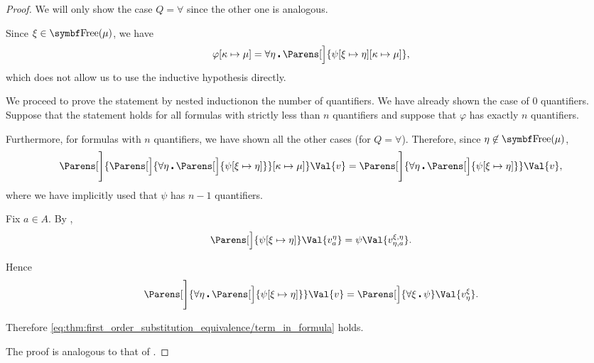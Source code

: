 \begin{proof}
  We will only show the case \( Q = \forall \) since the other one is analogous.

  Since \( \xi \in \Bold{Free}(\mu) \), we have
  \begin{equation*}
    \varphi[\kappa \mapsto \mu]
    =
    \forall \eta \centerdot \Parens[\Big]{ \psi[\xi \mapsto \eta][\kappa \mapsto \mu] },
  \end{equation*}
  which does not allow us to use the inductive hypothesis directly.

  We proceed to prove the statement by nested induction\IND on the number of quantifiers. We have already shown the case of \( 0 \) quantifiers. Suppose that the statement holds for all formulas with strictly less than \( n \) quantifiers and suppose that \( \varphi \) has exactly \( n \) quantifiers.

  Furthermore, for formulas with \( n \) quantifiers, we have shown all the other cases (for \( Q = \forall \)). Therefore, since \( \eta \not\in \Bold{Free}(\mu) \),
  \begin{equation*}
    \Parens[\Bigg]{ \Parens[\Big]{ \forall \eta \centerdot \Parens[\Big]{ \psi[\xi \mapsto \eta] } }[\kappa \mapsto \mu] }\Val{v}
    =
    \Parens[\Bigg]{\forall \eta \centerdot \Parens[\Big]{ \psi[\xi \mapsto \eta] } }\Val{v},
  \end{equation*}
  where we have implicitly used that \( \psi \) has \( n - 1 \) quantifiers.

  Fix \( a \in A \). By ,
  \begin{equation*}
    \Parens[\Big]{ \psi[\xi \mapsto \eta] }\Val{v_a^\eta} = \psi\Val{v_{\eta,a}^{\xi,\eta}}.
  \end{equation*}

  Hence
  \begin{equation*}
    \Parens[\Bigg]{\forall \eta \centerdot \Parens[\Big]{ \psi[\xi \mapsto \eta] } }\Val{v}
    =
    \Parens[\Big]{\forall \xi \centerdot \psi }\Val{v_\eta^\xi}.
  \end{equation*}

  Therefore \eqref{eq:thm:first_order_substitution_equivalence/term_in_formula} holds.

   The proof is analogous to that of .
\end{proof}

